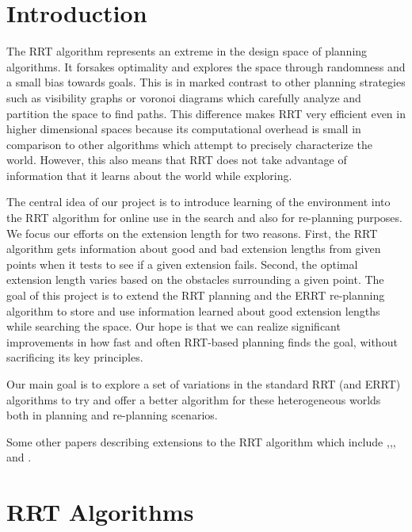 \documentclass[10pt,twoside,twocolumn]{article}
\begin{document}
\maketitle

\section{Introduction} 
The RRT algorithm represents an extreme in the design space of planning algorithms.  
It forsakes optimality and explores the space through randomness and a small bias towards goals.  This is in marked contrast to other planning strategies such as visibility graphs or voronoi diagrams which carefully analyze and partition the space to find paths.  
This difference makes RRT very efficient even in higher dimensional spaces because its computational overhead is small in comparison to other algorithms which attempt to precisely characterize the world.  However, this also means that RRT does not take advantage of information that it learns about the world while exploring.

The central idea of our project is to introduce learning of the environment into the RRT algorithm for online use in the search and also for re-planning purposes.  We focus our efforts on the extension length for two reasons.  First, the RRT algorithm gets information about good and bad extension lengths from given points when it tests to see if a given extension fails.  Second, the optimal extension length varies based on the obstacles surrounding a given point.  The goal of this project is to extend the RRT planning and the ERRT re-planning algorithm to store and use information learned about good extension lengths while searching the space.  Our hope is that we can realize significant improvements in how fast and often RRT-based planning finds the goal, without sacrificing its key principles.

Our main goal is to explore a set of variations in the standard RRT (and ERRT) algorithms to try and offer a better algorithm for these heterogeneous worlds both in planning and re-planning scenarios.

Some other papers describing extensions to the RRT algorithm which include \cite{Lavalle98rapidly-exploringrandom},\cite{Lindemann04incrementallyreducing},\cite{Jaillet05adaptivetuning}, and \cite{moplan2009}.


\section{RRT Algorithms}
\end{document}
